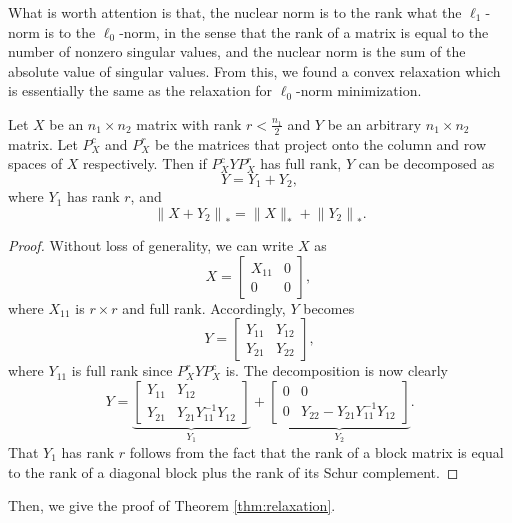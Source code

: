 \documentclass[11pt]{article}
\begin{document}
What is worth attention is that, the nuclear norm is to the rank what the \(\ell_1\)-norm is to the \(\ell_0\)-norm, in the sense that the rank of a matrix is equal to the number of nonzero singular values, and the nuclear norm is the sum of the absolute value of singular values. From this, we found a convex relaxation which is essentially the same as the relaxation for \(\ell_0\)-norm minimization. 
\begin{lemma}
    Let $X$ be an $n_{1} \times n_{2}$ matrix with rank $r<\frac{n_{1}}{2}$ and $Y$ be an arbitrary $n_{1} \times n_{2}$ matrix. Let $P_{X}^{c}$ and $P_{X}^{r}$ be the matrices that project onto the column and row spaces of $X$ respectively. Then if $P_{X}^{c} Y P_{X}^{r}$ has full rank, $Y$ can be decomposed as
    $$
    Y=Y_{1}+Y_{2},
    $$
    where $Y_{1}$ has rank $r$, and
    $$
    \left\|X+Y_{2}\right\|_{*}=\|X\|_{*}+\left\|Y_{2}\right\|_{*} .
    $$
\end{lemma}
\begin{proof}
Without loss of generality, we can write $X$ as
$$
X=\left[\begin{array}{cc}
X_{11} & 0 \\
0 & 0
\end{array}\right] \text {, }
$$
where $X_{11}$ is $r \times r$ and full rank. Accordingly, $Y$ becomes
$$
Y=\left[\begin{array}{ll}
Y_{11} & Y_{12} \\
Y_{21} & Y_{22}
\end{array}\right],
$$
where $Y_{11}$ is full rank since $P_{X}^{r} Y P_{X}^{c}$ is. The decomposition is now clearly
$$
Y=\underbrace{\left[\begin{array}{cc}
Y_{11} & Y_{12} \\
Y_{21} & Y_{21} Y_{11}^{-1} Y_{12}
\end{array}\right]}_{Y_{1}}+\underbrace{\left[\begin{array}{cc}
0 & 0 \\
0 & Y_{22}-Y_{21} Y_{11}^{-1} Y_{12}
\end{array}\right]}_{Y_{2}} .
$$
That $Y_{1}$ has rank $r$ follows from the fact that the rank of a block matrix is equal to the rank of a diagonal block plus the rank of its Schur complement.
\end{proof}
Then, we give the proof of Theorem \ref{thm:relaxation}.
\end{document}
